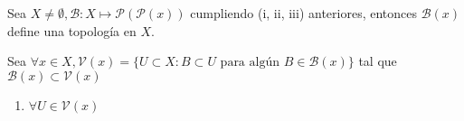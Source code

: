 \begin{prop}
  Sea $ X \neq \emptyset, \mathcal{B}: X \mapsto \mathcal{P}(\mathcal{P}(x))$ cumpliendo (i, ii, iii) anteriores, entonces $\mathcal{B}(x)$ define una topología en $X$.
\end{prop}

\begin{dem}
  Sea $\forall x \in X, \mathcal{V}(x) = \{ U \subset X : B \subset U  \text{ para algún } B \in \mathcal{B}(x) \}$ tal que $\mathcal{B}(x) \subset \mathcal{V}(x)$
  \begin{enumerate}[label=(\roman*)]
    \item $\forall U \in \mathcal{V}(x)$
  \end{enumerate}
\end{dem}
